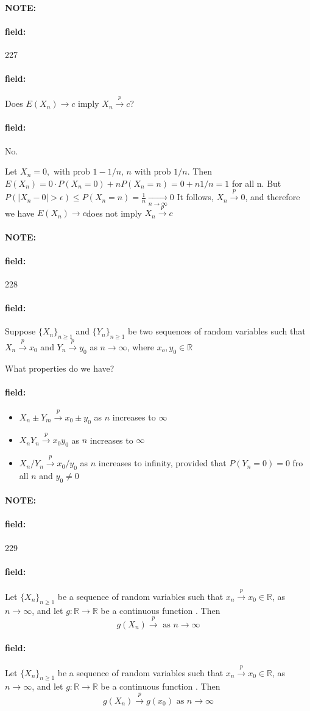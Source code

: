 \documentclass[12pt]{article}
\newenvironment{note}{\paragraph{NOTE:}}{}
\newenvironment{field}{\paragraph{field:}}{}
\begin{document}
\begin{note} \begin{field} \tiny 227 \end{field}
  \begin{field}
    Does $E(X_n) \to c $ imply $X_n \overset{p}{\to}c$?
  \end{field}
  \begin{field}
    No.

    Let $X_n = 0, $ with prob $1 - 1/n$, $n$ with prob $1/n$.
    Then $E(X_n) = 0 \cdot P(X_n = 0) + n P(X_n = n) = 0  + n 1/n = 1$ for all n.
    But $P(|X_n - 0| > \epsilon) \leq P(X_n = n) = \frac{1}{n } \underset{n \to \infty}{\to} 0$
    It follows, $X_n \overset{p}{\to} 0 $, and therefore we have $E(X_n) \to c $does not imply $X_n \overset{p}{\to}c$
  \end{field}
\end{note}

\begin{note} \begin{field} \tiny 228 \end{field}
  \begin{field}
     Suppose $\{X_n\}_{n \geq 1}$ and $\{Y_n\}_{n \geq 1}$ be two sequences of random variables such that $X_n \overset{p}{\to} x_0$ and $Y_n \overset{p}{\to} y_0$ as $n \to \infty$, where $x_o, y_0 \in \mathbb{R}$

     What properties do we have?
  \end{field}
  \begin{field}
    \begin{itemize}
      \item $X_n \pm Y_m \overset{p}{\to} x_0 \pm y_0$ as $n$ increases to $\infty$
      \item $X_nY_n \overset{p}{\to} x_0y_0$ as $n$ increases to $\infty$
      \item $X_n/Y_n \overset{p}{\to} x_0/y_0$ as $n$ increases to infinity, provided that $P(Y_n = 0) = 0 $ fro all $n$ and $y_0 \neq 0$
    \end{itemize}
  \end{field}
\end{note}

\begin{note} \begin{field} \tiny 229 \end{field}
  \begin{field}
    Let $\{X_n\}_{n \geq 1}$ be a sequence of random variables such that $x_n \overset{p}{\to} x_0 \in \mathbb{R}$, as $n \to \infty$, and let $g: \mathbb{R} \to \mathbb{R}$ be a continuous function . Then $$g(X_n) \overset{p}{\to}  \text{ as } n \to \infty$$
  \end{field}
  \begin{field}
    Let $\{X_n\}_{n \geq 1}$ be a sequence of random variables such that $x_n \overset{p}{\to} x_0 \in \mathbb{R}$, as $n \to \infty$, and let $g: \mathbb{R} \to \mathbb{R}$ be a continuous function . Then $$g(X_n) \overset{p}{\to} g(x_0) \text{ as } n \to \infty$$
  \end{field}
\end{note}
\end{document}
